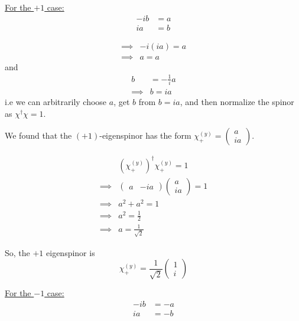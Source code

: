 \documentclass{article}
\begin{document}
\begin{enumerate}[label=(\alph*)]
  \underline{For the $+1$ case:}
  \begin{align*}
    -ib &= a \\
    ia &= b
  \end{align*}

  \begin{align*}
    \implies & -i(ia) = a \\
    \implies & \boxed{a = a}
  \end{align*}
  and 
  \begin{align*}
    b &= -\frac{1}{i}a \\
    \implies &\boxed{b = i a}
  \end{align*}
  i.e we can arbitrarily choose $a$, get $b$ from $b = ia$, and then normalize the spinor as $\chi^{\dagger} \chi = 1$. 
  
  We found that the $(+1)$-eigenspinor has the form $\chi_+^{(y)} = \begin{pmatrix}
    a \\
    ia 
  \end{pmatrix}$.

  \begin{align*}
    &(\chi_+^{(y)})^{\dagger} \chi_+^{(y)} = 1 \\
    \implies &\begin{pmatrix}
      a & -ia
    \end{pmatrix} \begin{pmatrix}
      a \\
      ia
    \end{pmatrix} = 1 \\
    \implies &a^2 + a^2 = 1 \\
    \implies &a^2 = \frac{1}{2} \\
    \implies &\boxed{a = \frac{1}{\sqrt{2}}}
  \end{align*}

  So, the $+1$ eigenspinor is 
  \[ \boxed{ \chi_+^{(y)} = \frac{1}{\sqrt{2}} \begin{pmatrix} 1 \\ i \end{pmatrix} } \]

  \underline{For the $-1$ case:}
  \begin{align*}
    -ib &= -a \\
    ia &= -b
  \end{align*}


\end{enumerate}
\end{document}
